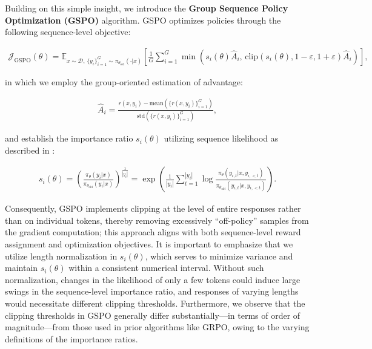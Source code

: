 Building on this simple insight, we introduce the \textbf{Group Sequence Policy Optimization (GSPO)} algorithm. GSPO optimizes policies through the following sequence-level objective:

\begin{align}
\mathcal{J}_\text{GSPO} (\theta) =
\mathbb{E}_{ x \sim \mathcal{D},\, \{y_i\}_{i=1}^G \sim \pi_{\theta_\text{old}}( \cdot | x) }
\left[ 
\frac{1}{G} \sum_{i=1}^{G}
\min \left( s_{i}(\theta)  \widehat{A}_{i},  \, \mathrm{clip} \left( s_{i}(\theta), 1 - {\varepsilon}, 1 + {\varepsilon} \right) \widehat{A}_{i} \right) 
\right],
\label{equ:gspo}
\end{align}

in which we employ the group-oriented estimation of advantage:

\begin{align}
\widehat{A}_{i} = \frac{r(x, y_i) - \mathrm{mean} \left( \{ r(x, y_i) \}_{i=1}^G \right) }{ \mathrm{std} \left( \{ r(x, y_i) \}_{i=1}^G \right) },
\end{align}

and establish the importance ratio $s_{i}(\theta)$ utilizing sequence likelihood as described in \citet{click}:

\begin{align}
s_{i}(\theta) = \left( \frac{ \pi_{\theta} (y_i | x) }{ \pi_{\theta_\text{old}} (y_i | x)} \right)^{\frac{1}{|y_i|}}
=
\exp \left( \frac{1}{|y_i|} \sum_{t=1}^{|y_i|} \log \frac{ \pi_{\theta} (y_{i,t} | x, y_{i,<t}) }{ \pi_{\theta_\text{old}} (y_{i,t} | x,y_{i,<t})} \right).
\end{align}

Consequently, GSPO implements clipping at the level of entire responses rather than on individual tokens, thereby removing excessively ``off-policy'' samples from the gradient computation; this approach aligns with both sequence-level reward assignment and optimization objectives. It is important to emphasize that we utilize length normalization in $s_{i}(\theta)$, which serves to minimize variance and maintain $s_{i}(\theta)$ within a consistent numerical interval. Without such normalization, changes in the likelihood of only a few tokens could induce large swings in the sequence-level importance ratio, and responses of varying lengths would necessitate different clipping thresholds. Furthermore, we observe that the clipping thresholds in GSPO generally differ substantially—in terms of order of magnitude—from those used in prior algorithms like GRPO, owing to the varying definitions of the importance ratios.

